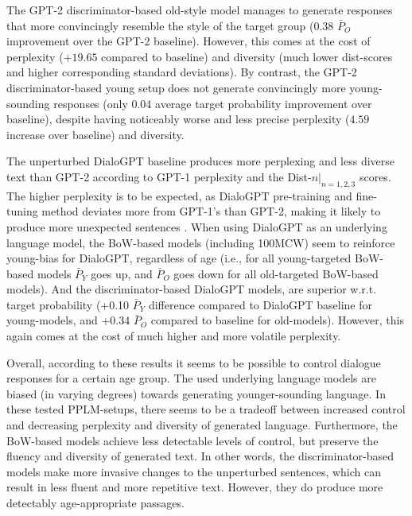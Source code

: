 The GPT-2 discriminator-based old-style model manages to generate responses that more convincingly resemble the style of the target group (0.38 $\bar{P}_O$ improvement over the GPT-2 baseline). However, this comes at the cost of perplexity ($+19.65$ compared to baseline) and diversity (much lower dist-scores and higher corresponding standard deviations). By contrast, the GPT-2 discriminator-based young setup does not generate convincingly more young-sounding responses (only 0.04 average target probability improvement over baseline), despite having noticeably worse and less precise perplexity ($4.59$ increase over baseline) and diversity.

The unperturbed DialoGPT baseline produces more perplexing and less diverse text than GPT-2 according to GPT-1 perplexity and the Dist-$n |_{n = 1,2,3}$ scores. The higher perplexity is to be expected, as DialoGPT pre-training and fine-tuning method deviates more from GPT-1's than GPT-2, making it likely to produce more unexpected sentences \cite{zhang2019dialogpt}. When using DialoGPT as an underlying language model, the BoW-based models (including 100MCW) seem to reinforce young-bias for DialoGPT, regardless of age (i.e., for all young-targeted BoW-based models $\bar{P}_Y$ goes up, and $\bar{P}_O$ goes down for all old-targeted BoW-based models). And the discriminator-based DialoGPT models, are superior w.r.t. target probability (+0.10 $\bar{P}_Y$ difference compared to DialoGPT baseline for young-models, and +0.34 $\bar{P}_O$ compared to baseline for old-models). However, this again comes at the cost of much higher and more volatile perplexity.

Overall, according to these results it seems to be possible to control dialogue responses for a certain age group. The used underlying language models are biased (in varying degrees) towards generating younger-sounding language. In these tested PPLM-setups, there seems to be a tradeoff between increased control and decreasing perplexity and diversity of generated language. Furthermore, the BoW-based models achieve less detectable levels of control, but preserve the fluency and diversity of generated text. In other words, the discriminator-based models make more invasive changes to the unperturbed sentences, which can result in less fluent and more repetitive text. However, they do produce more detectably age-appropriate passages.

